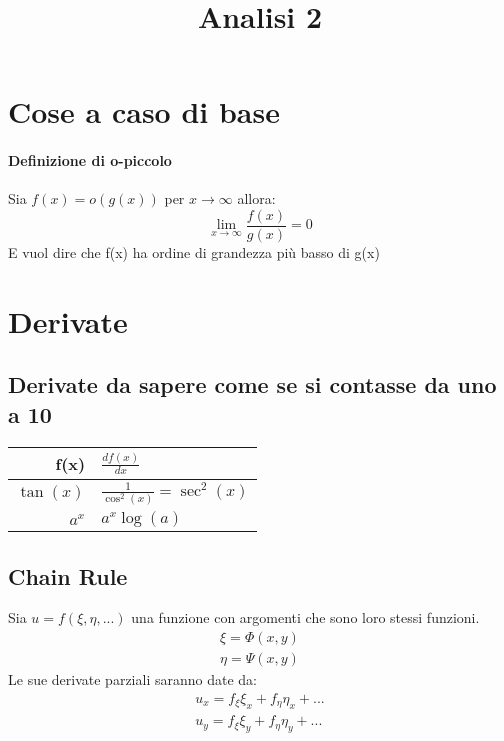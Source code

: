 \documentclass[16pt]{article}
\title{Analisi 2}
\begin{document}
\maketitle

\section{Cose a caso di base}
\paragraph{Definizione di o-piccolo} Sia $f(x) = o(g(x))$ per $x \rightarrow \infty$ allora:
\begin{equation*}
	\lim_{x \rightarrow \infty}
	\frac{f(x)}{g(x)} = 0
\end{equation*}
\indent E vuol dire che f(x) ha ordine di grandezza più basso di g(x)


\section{Derivate}
\subsection{Derivate da sapere come se si contasse da uno a 10}
\begin{center}
\begin{tabular}{r | l}
	f(x) & $\frac{df(x)}{dx}$ \\ [1ex]
	\hline
	$\tan(x)$	& $\frac{1}{\cos^2(x)} = \sec^2(x)$ \\ [0.5ex]
	$a^x$		& $a^x \log(a)$ \\ [0.5ex]
\end{tabular}
\end{center}

\subsection{Chain Rule}

Sia $u = f(\xi, \eta, ...)$ una funzione con argomenti che sono loro stessi funzioni.
\begin{align*}
	\xi = \Phi(x,y) \\
	\eta = \Psi(x,y)
\end{align*}
Le sue derivate parziali saranno date da:
\begin{align*}
	u_x = f_\xi \xi_x + f_\eta \eta_x + . . . \\
	u_y = f_\xi \xi_y + f_\eta \eta_y + . . .
\end{align*}
\end{document}
